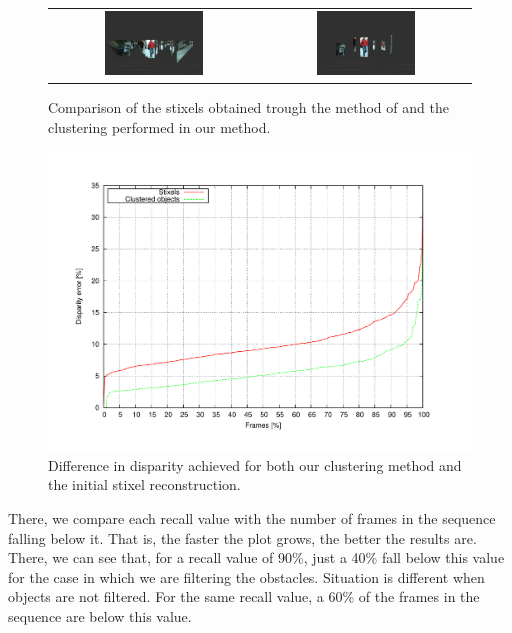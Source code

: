 \begin{figure}[h!]
\begin{tabular}{cc}
\includegraphics[width=0.49\textwidth]{stixelsDetection}\label{fig:cp04_stixels_detection} &
\includegraphics[width=0.49\textwidth]{obstacleDetection}\label{fig:cp04_obstacle_detection}
\end{tabular}
\caption{Comparison of the stixels obtained trough the method of \cite{benenson2012pedestrian} and the clustering performed in our method.}\label{fig:cp04_clustering_comparison}
\end{figure}

\begin{figure}[h!]
\centering
\includegraphics[width=\textwidth,height=0.5\textwidth,trim=50 40 80 60,clip]{disparity}
\caption{Difference in disparity achieved for both our clustering method and the initial stixel reconstruction.}\label{fig:cp04_disparity_comparison}
\end{figure}

There, we compare each recall value with the number of frames in the sequence falling below it. That is, the faster the plot grows, the better the results are. There, we can see that, for a recall value of 90\%, just a 40\% fall below this value for the case in which we are filtering the obstacles. Situation is different when objects are not filtered. For the same recall value, a 60\% of the frames in the sequence are below this value.

